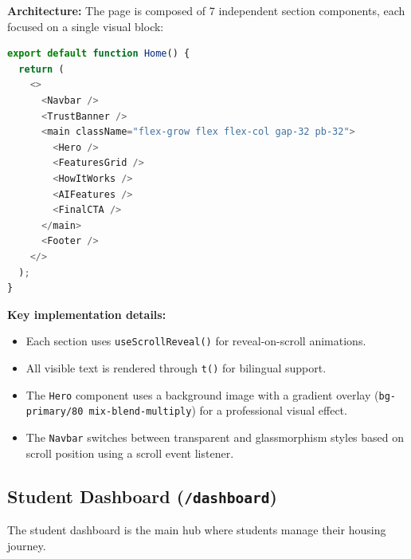 \documentclass[12pt,a4paper]{article}
\begin{document}

\textbf{Architecture:} The page is composed of 7 independent section components, each focused on a single visual block:

\begin{lstlisting}[language=TypeScript,title={page.tsx — Landing page composition}]
export default function Home() {
  return (
    <>
      <Navbar />
      <TrustBanner />
      <main className="flex-grow flex flex-col gap-32 pb-32">
        <Hero />
        <FeaturesGrid />
        <HowItWorks />
        <AIFeatures />
        <FinalCTA />
      </main>
      <Footer />
    </>
  );
}
\end{lstlisting}

\textbf{Key implementation details:}
\begin{itemize}[leftmargin=2em]
    \item Each section uses \texttt{useScrollReveal()} for reveal-on-scroll animations.
    \item All visible text is rendered through \texttt{t()} for bilingual support.
    \item The \texttt{Hero} component uses a background image with a gradient overlay (\texttt{bg-primary/80 mix-blend-multiply}) for a professional visual effect.
    \item The \texttt{Navbar} switches between transparent and glassmorphism styles based on scroll position using a scroll event listener.
\end{itemize}

\subsection{Student Dashboard (\texttt{/dashboard})}

The student dashboard is the main hub where students manage their housing journey.

\end{document}
